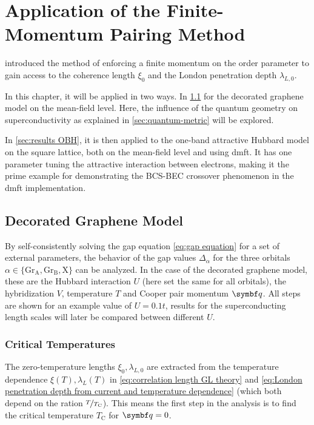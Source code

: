 \documentclass[../notes.tex]{subfiles}
\begin{document}
	
\chapter{Application of the Finite-Momentum Pairing Method}\label{ch:results}

 introduced the method of enforcing a finite momentum on the order parameter to gain access to the coherence length \(\xi_0\) and the London penetration depth \(\lambda_{L, 0}\).

In this chapter, it will be applied in two ways.
In \cref{sec:results decorated graphene model} for the decorated graphene model on the mean-field level.
Here, the influence of the quantum geometry on superconductivity as explained in \cref{sec:quantum-metric} will be explored.

In \cref{sec:results OBH}, it is then applied to the one-band attractive Hubbard model on the square lattice, both on the mean-field level and using \gls{dmft}.
It has one parameter tuning the attractive interaction between electrons, making it the prime example for demonstrating the BCS-BEC crossover phenomenon in the \gls{dmft} implementation.


\section{Decorated Graphene Model}\label{sec:results decorated graphene model}

By self-consistently solving the gap equation \cref{eq:gap equation} for a set of external parameters, the behavior of the gap values \(\Delta_{\alpha}\) for the three orbitals \(\alpha \in \{\mathrm{Gr}_{\mathrm{A}}, \mathrm{Gr}_{\mathrm{B}}, \mathrm{X}\}\) can be analyzed.
In the case of the decorated graphene model, these are the Hubbard interaction \(U\) (here set the same for all orbitals), the hybridization \(V\), temperature \(T\) and Cooper pair momentum \(\vb{q}\).
All steps are shown for an example value of \(U = 0.1t\), results for the superconducting length scales will later be compared between different \(U\).

\subsection*{Critical Temperatures}

The zero-temperature lengths \(\xi_0, \lambda_{L,0}\) are extracted from the temperature dependence \(\xi (T), \lambda_L (T)\) in \cref{eq:correlation length GL theory} and \cref{eq:London penetration depth from current and temperature dependence} (which both depend on the ration \(\nicefrac{T}{T_{\mathrm{C}}}\)).
This means the first step in the analysis is to find the critical temperature \(T_{\mathrm{C}}\) for \(\vb{q} = 0\).
\end{document}
